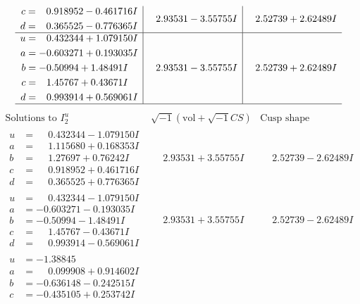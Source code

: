 \documentclass[1p]{elsarticle_modified}
\theoremstyle{definition}
\newcommand{\I}{\sqrt{-1}}
\begin{document}
$$\begin{array}{c|c|c}
\begin{aligned}
c &= \phantom{-}0.918952 - 0.461716 I \\
d &= \phantom{-}0.365525 - 0.776365 I\end{aligned}
 & \phantom{-}2.93531 - 3.55755 I & \phantom{-}2.52739 + 2.62489 I \\ \hline\begin{aligned}
u &= \phantom{-}0.432344 + 1.079150 I \\
a &= -0.603271 + 0.193035 I \\
b &= -0.50994 + 1.48491 I \\
c &= \phantom{-}1.45767 + 0.43671 I \\
d &= \phantom{-}0.993914 + 0.569061 I\end{aligned}
 & \phantom{-}2.93531 - 3.55755 I & \phantom{-}2.52739 + 2.62489 I\\
 \hline 
 \end{array}$$\newpage$$\begin{array}{c|c|c}  
\text{Solutions to }I^u_{2}& \I (\text{vol} + \sqrt{-1}CS) & \text{Cusp shape}\\
 \hline 
\begin{aligned}
u &= \phantom{-}0.432344 - 1.079150 I \\
a &= \phantom{-}1.115680 + 0.168353 I \\
b &= \phantom{-}1.27697 + 0.76242 I \\
c &= \phantom{-}0.918952 + 0.461716 I \\
d &= \phantom{-}0.365525 + 0.776365 I\end{aligned}
 & \phantom{-}2.93531 + 3.55755 I & \phantom{-}2.52739 - 2.62489 I \\ \hline\begin{aligned}
u &= \phantom{-}0.432344 - 1.079150 I \\
a &= -0.603271 - 0.193035 I \\
b &= -0.50994 - 1.48491 I \\
c &= \phantom{-}1.45767 - 0.43671 I \\
d &= \phantom{-}0.993914 - 0.569061 I\end{aligned}
 & \phantom{-}2.93531 + 3.55755 I & \phantom{-}2.52739 - 2.62489 I \\ \hline\begin{aligned}
u &= -1.38845\phantom{ +0.000000I} \\
a &= \phantom{-}0.099908 + 0.914602 I \\
b &= -0.636148 - 0.242515 I \\
c &= -0.435105 + 0.253742 I \\

\end{aligned}
\end{array}$$
\end{document}
